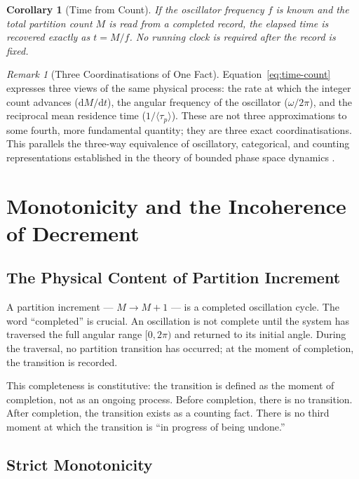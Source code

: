\documentclass[twocolumn,10pt,a4paper]{article}
\theoremstyle{thmstyle}
\newtheorem{corollary}[theorem]{Corollary}
\theoremstyle{definition}
\theoremstyle{remark}
\newtheorem{remark}[theorem]{Remark}
\newcommand{\tp}{\langle\tau_{p}\rangle}
\newcommand{\dM}{\mathrm{d}M}
\newcommand{\dt}{\mathrm{d}t}
\begin{document}
\begin{corollary}[Time from Count]
\label{cor:time-from-count}
If the oscillator frequency $f$ is known and the total partition count $M$ is read from a completed record, the elapsed time is recovered exactly as $t = M/f$. No running clock is required after the record is fixed.
\end{corollary}

\begin{remark}[Three Coordinatisations of One Fact]
Equation~\eqref{eq:time-count} expresses three views of the same physical process: the rate at which the integer count advances ($\dM/\dt$), the angular frequency of the oscillator ($\omega/2\pi$), and the reciprocal mean residence time ($1/\tp$). These are not three approximations to some fourth, more fundamental quantity; they are three exact coordinatisations. This parallels the three-way equivalence of oscillatory, categorical, and counting representations established in the theory of bounded phase space dynamics \citep{arnold1989,birkhoff1931}.
\end{remark}

\section{Monotonicity and the Incoherence of Decrement}
\label{sec:monotone}

\subsection{The Physical Content of Partition Increment}

A partition increment --- $M \to M + 1$ --- is a completed oscillation cycle. The word ``completed'' is crucial. An oscillation is not complete until the system has traversed the full angular range $[0, 2\pi)$ and returned to its initial angle. During the traversal, no partition transition has occurred; at the moment of completion, the transition is recorded.

This completeness is constitutive: the transition is defined as the moment of completion, not as an ongoing process. Before completion, there is no transition. After completion, the transition exists as a counting fact. There is no third moment at which the transition is ``in progress of being undone.''

\subsection{Strict Monotonicity}
\end{document}
